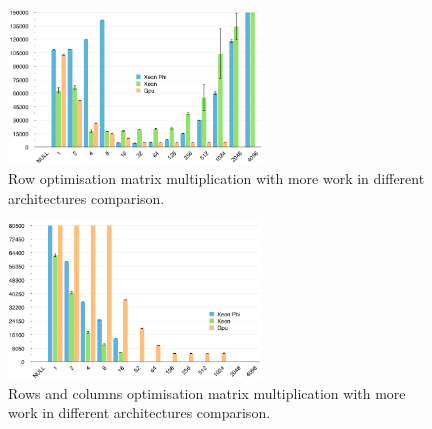 \begin{figure}[!h]
    \centering
    \includegraphics[width=0.6\textwidth]{figures/opt2_comp.png}
    \caption{Row optimisation matrix multiplication with more work in different architectures comparison.}
    \label{RowsComp}
\end{figure}

\begin{figure}[!h]
    \centering
    \includegraphics[width=0.6\textwidth]{figures/opt3_comp.png}
    \caption{Rows and columns optimisation matrix multiplication with more work in different architectures comparison.}
    \label{RowsColsComp}
\end{figure}











